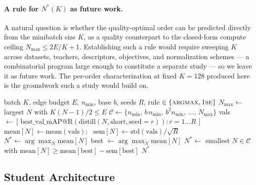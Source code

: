 \documentclass[11pt,letterpaper]{article}
\begin{document}
\paragraph{A rule for \texorpdfstring{$N^\ast(K)$}{N*(K)} as future work.} A natural
question is whether the quality-optimal order can be predicted directly from the
minibatch size $K$, as a quality counterpart to the closed-form compute ceiling
$N_{\max} \le 2E/K + 1$. Establishing such a rule would require sweeping $K$ across
datasets, teachers, descriptors, objectives, and normalization schemes --- a
combinatorial program large enough to constitute a separate study --- so we leave it
as future work. The per-order characterization at fixed $K = 128$ produced here is the
groundwork such a study would build on.

\begin{algorithm}[htbp]
\caption{Selecting $N$ (budget-bounded log-spaced sweep)}
\label{alg:order}
\begin{algorithmic}[1]
\Require batch $K$, edge budget $E$, $n_{\min}$, base $b$, seeds $R$, rule $\in \{\textsc{argmax}, \textsc{1se}\}$
\State $N_{\max} \gets$ largest $N$ with $K(N-1)/2 \leq E$ 
\State $\mathcal{C} \gets \{ n_{\min},\, b\,n_{\min},\, b^2 n_{\min},\, \ldots,\, N_{\max} \}$ 
 
    \State vals $\gets [\, \mathrm{best\_val\_mAP@R}(\mathrm{distill}(N, \text{short}, \text{seed}=r)) : r = 1 \ldots R \,]$
    \State $\mathrm{mean}[N] \gets \mathrm{mean}(\text{vals})$; \ $\mathrm{sem}[N] \gets \mathrm{std}(\text{vals}) / \sqrt{R}$
\EndFor
{}
    \State $N^\ast \gets \arg\max_N \mathrm{mean}[N]$
\Else {}
    \State best $\gets \arg\max_N \mathrm{mean}[N]$
    \State $N^\ast \gets$ smallest $N \in \mathcal{C}$ with $\mathrm{mean}[N] \geq \mathrm{mean}[\text{best}] - \mathrm{sem}[\text{best}]$
\EndIf
\State \Return $N^\ast$ 
\end{algorithmic}
\end{algorithm}

\subsection{Student Architecture}
\label{sec:student-arch}
\end{document}
